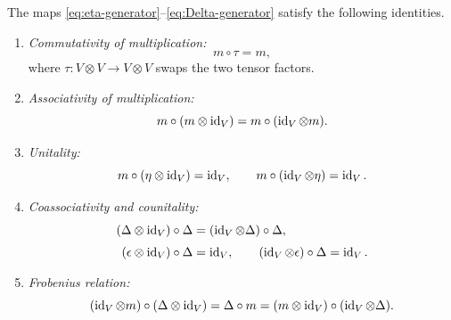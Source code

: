 \begin{proposition}\label{prop:cob2-relations}
The maps \eqref{eq:eta-generator}--\eqref{eq:Delta-generator} satisfy the following identities.
\begin{enumerate}
\item \emph{Commutativity of multiplication:}
\begin{equation}\label{eq:commutativity}
m \circ \tau = m,
\end{equation}
where $\tau : V \otimes V \to V \otimes V$ swaps the two tensor factors.

\item \emph{Associativity of multiplication:}
\begin{equation}\label{eq:associativity}
m \circ (m \otimes \operatorname{id}_V) = m \circ (\operatorname{id}_V \otimes m).
\end{equation}

\item \emph{Unitality:}
\begin{equation}\label{eq:unitality-left}
m \circ (\eta \otimes \operatorname{id}_V) = \operatorname{id}_V,
\qquad
m \circ (\operatorname{id}_V \otimes \eta) = \operatorname{id}_V.
\end{equation}

\item \emph{Coassociativity and counitality:}
\begin{align}
(\Delta \otimes \operatorname{id}_V)\circ \Delta &= (\operatorname{id}_V \otimes \Delta)\circ \Delta, \label{eq:coassociativity} \\[1mm]
(\epsilon \otimes \operatorname{id}_V)\circ \Delta &= \operatorname{id}_V,
\qquad
(\operatorname{id}_V \otimes \epsilon)\circ \Delta = \operatorname{id}_V. \label{eq:counitality}
\end{align}

\item \emph{Frobenius relation:}
\begin{equation}\label{eq:frobenius-relation}
(\operatorname{id}_V \otimes m)\circ (\Delta \otimes \operatorname{id}_V)
=
\Delta \circ m
=
(m \otimes \operatorname{id}_V)\circ (\operatorname{id}_V \otimes \Delta).
\end{equation}
\end{enumerate}
\end{proposition}

